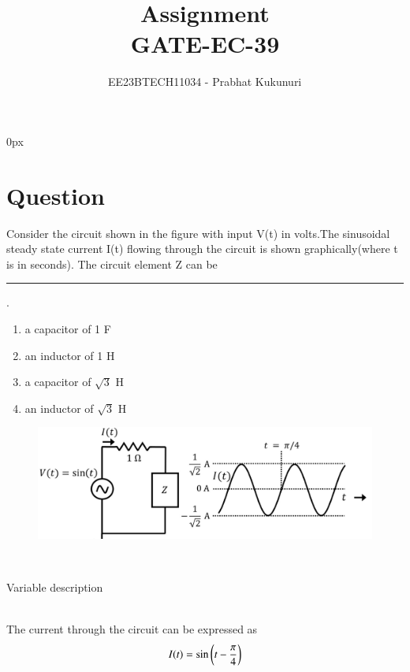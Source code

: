 \documentclass[journal,12pt,twocolumn]{IEEEtran}
\theoremstyle{remark}
\begin{document}
\parindent 0px


\vspace{3cm}

\title{Assignment\\[1ex]GATE-EC-39}
\author{EE23BTECH11034 - Prabhat Kukunuri$^{}$%
}
\maketitle
\newpage
\bigskip

\renewcommand{\thefigure}{\theenumi}
\renewcommand{\thetable}{\theenumi}
\section{Question}
Consider the circuit shown in the figure with input V(t) in volts.The sinusoidal steady state current I(t) flowing through the circuit is shown graphically(where t is in seconds). The circuit element Z can be\rule{1.5cm}{0.15mm}.
\begin{enumerate}
    \item a capacitor of 1 F
    \item an inductor of 1 H
    \item a capacitor of $\sqrt{3}$ H
    \item an inductor of $\sqrt{3}$ H
\end{enumerate}
\begin{figure}[ht]
    \centering
    \includegraphics[width=\columnwidth]{2022/EC/39/figs/Figure_1.png}
    \label{fig:GATE.2022.EC.39.1}
\end{figure}
\solution\\
\fi
\begin{table}[h]
    \centering
    
    \caption{Variable description}
    \label{tab:GATE.2022.EC.39.1}
\end{table}\\
The current through the circuit can be expressed as
\begin{align}
    I(t)=\sin\left(t-\frac{\pi}{4}\right)
\end{align}
\end{document}
